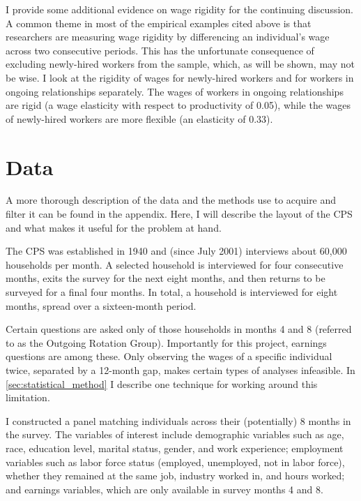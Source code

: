 \documentclass[11pt]{article}
\begin{document}
I provide some additional evidence on wage rigidity for the continuing discussion.
A common theme in most of the empirical examples cited above is that researchers are measuring wage rigidity by differencing an individual's wage across two consecutive periods.
This has the unfortunate consequence of excluding newly-hired workers from the sample, which, as will be shown, may not be wise.
I look at the rigidity of wages for newly-hired workers and for workers in ongoing relationships separately.
The wages of workers in ongoing relationships are rigid (a wage elasticity with respect to productivity of 0.05), while the wages of newly-hired workers are more flexible (an elasticity of 0.33).


\section{Data}
\label{sec:data}

A more thorough description of the data and the methods use to acquire and filter it can be found in the appendix.
Here, I will describe the layout of the CPS and what makes it useful for the problem at hand.

The CPS was established in 1940 and (since July 2001) interviews about 60,000 households per month.
A selected household is interviewed for four consecutive months, exits the survey for the next eight months, and then returns to be surveyed for a final four months.
In total, a household is interviewed for eight months, spread over a sixteen-month period.

Certain questions are asked only of those households in months 4 and 8 (referred to as the Outgoing Rotation Group).
Importantly for this project, earnings questions are among these.
Only observing the wages of a specific individual twice, separated by a 12-month gap, makes certain types of analyses infeasible.
In \autoref{sec:statistical_method} I describe one technique for working around this limitation.

I constructed a panel matching individuals across their (potentially) 8 months in the survey.
The variables of interest include demographic variables such as age, race, education level, marital status, gender, and work experience;
employment variables such as labor force status (employed, unemployed, not in labor force), whether they remained at the same job, industry worked in, and hours worked;
and earnings variables, which are only available in survey months 4 and 8.
\end{document}
